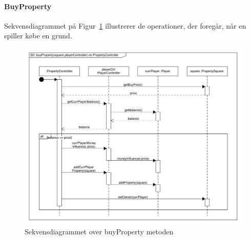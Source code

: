 \documentclass[class=article, crop=false]{standalone}
\begin{document}
    \paragraph{BuyProperty\\}
    Sekvensdiagrammet på Figur~\ref{fig:SD_buy_property} illustrerer de operationer, der foregår, når en spiller købe en grund.
    \begin{figure}[H]

\hbox{\hspace{-2cm}\includegraphics[scale=0.6]{diagrams/SD_buy_property.pdf}}

        \caption{Sekvensdiagrammet over buyProperty metoden}\label{fig:SD_buy_property}
    \end{figure}
    \newpage
\end{document}

